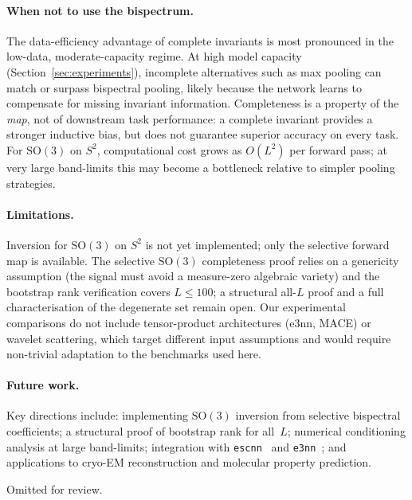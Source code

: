 \documentclass{article}
\theoremstyle{definition}
\theoremstyle{remark}
\newcommand{\SO}{\mathrm{SO}}
\theoremstyle{definition}
\begin{document}
\paragraph{When not to use the bispectrum.}
The data-efficiency advantage of complete invariants is most pronounced
in the low-data, moderate-capacity regime.
At high model capacity (Section~\ref{sec:experiments}), incomplete
alternatives such as max pooling can match or surpass bispectral pooling,
likely because the network learns to compensate for missing invariant
information.
Completeness is a property of the \emph{map}, not of downstream task
performance: a complete invariant provides a stronger inductive bias,
but does not guarantee superior accuracy on every task.
For $\SO(3)$ on $S^2$, computational cost grows as $O(L^2)$ per forward
pass; at very large band-limits this may become a bottleneck relative
to simpler pooling strategies.

\paragraph{Limitations.}
Inversion for $\SO(3)$ on $S^2$ is not yet implemented; only the
selective forward map is available. The selective $\SO(3)$ completeness
proof relies on a genericity assumption (the signal must avoid a
measure-zero algebraic variety) and the bootstrap rank verification
covers $L \le 100$; a structural all-$L$ proof and a full
characterisation of the degenerate set remain open.
Our experimental comparisons do not include tensor-product
architectures (e3nn, MACE) or wavelet scattering, which target
different input assumptions and would require non-trivial adaptation
to the benchmarks used here.

\paragraph{Future work.}
Key directions include: implementing $\SO(3)$ inversion from selective
bispectral coefficients; a structural proof of bootstrap rank for all~$L$;
numerical conditioning analysis at large
band-limits; integration with \texttt{escnn}~\citep{cesa2022program} and
\texttt{e3nn}~\citep{geiger2022e3nn}; and applications to cryo-EM
reconstruction and molecular property prediction.

\begin{ack}
Omitted for review.
\end{ack}



\end{document}
